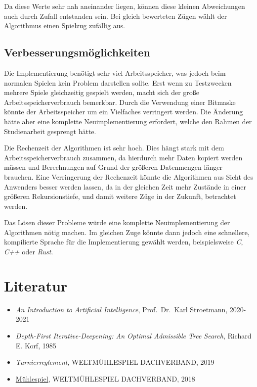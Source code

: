 \documentclass[11pt]{article}
\providecommand{\tightlist}{%
      \setlength{\itemsep}{0pt}\setlength{\parskip}{0pt}}
\begin{document}
Da diese Werte sehr nah aneinander liegen, können diese kleinen
Abweichungen auch durch Zufall entstanden sein. Bei gleich bewerteten
Zügen wählt der Algorithmus einen Spielzug zufällig aus.

    \hypertarget{verbesserungsmuxf6glichkeiten}{%
\subsection{Verbesserungsmöglichkeiten}\label{verbesserungsmuxf6glichkeiten}}

Die Implementierung benötigt sehr viel Arbeitsspeicher, was jedoch beim
normalen Spielen kein Problem darstellen sollte. Erst wenn zu
Testzwecken mehrere Spiele gleichzeitig gespielt werden, macht sich der
große Arbeitsspeicherverbrauch bemerkbar. Durch die Verwendung einer
Bitmaske könnte der Arbeitsspeicher um ein Vielfaches verringert werden.
Die Änderung hätte aber eine komplette Neuimplementierung erfordert,
welche den Rahmen der Studienarbeit gesprengt hätte.

Die Rechenzeit der Algorithmen ist sehr hoch. Dies hängt stark mit dem
Arbeitsspeicherverbrauch zusammen, da hierdurch mehr Daten kopiert
werden müssen und Berechnungen auf Grund der größeren Datenmengen länger
brauchen. Eine Verringerung der Rechenzeit könnte die Algorithmen aus
Sicht des Anwenders besser werden lassen, da in der gleichen Zeit mehr
Zustände in einer größeren Rekursionstiefe, und damit weitere Züge in
der Zukunft, betrachtet werden.

Das Lösen dieser Probleme würde eine komplette Neuimplementierung der
Algorithmen nötig machen. Im gleichen Zuge könnte dann jedoch eine
schnellere, kompilierte Sprache für die Implementierung gewählt werden,
beispielsweise \emph{C}, \emph{C++} oder \emph{Rust}.

    \hypertarget{literatur}{%
\section{Literatur}\label{literatur}}

\begin{itemize}
\tightlist
\item
  \emph{An Introduction to Artificial Intelligence}, Prof.~Dr.~Karl
  Stroetmann, 2020-2021
\item
  \emph{Depth-First Iterative-Deepening: An Optimal Admissible Tree
  Search}, Richard E. Korf, 1985
\item
  \emph{Turnierreglement}, WELTMÜHLESPIEL DACHVERBAND, 2019
\item
  \href{http://www.muehlespiel.eu/images/pdf/WMD_Spielregeln.pdf}{Mühlespiel},
  WELTMÜHLESPIEL DACHVERBAND, 2018
\end{itemize}
\end{document}
